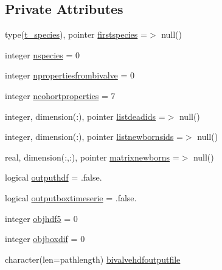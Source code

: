 \subsection*{Private Attributes}
\begin{DoxyCompactItemize}
\item 
type(\mbox{\hyperlink{structmodulewaterproperties_1_1t__species}{t\+\_\+species}}), pointer \mbox{\hyperlink{structmodulewaterproperties_1_1t__bivalve_aff0dedcc1fe7767061a4946a67d32e77}{firstspecies}} =$>$ null()
\item 
integer \mbox{\hyperlink{structmodulewaterproperties_1_1t__bivalve_aa56dd58a478ccddc5077475029f1688a}{nspecies}} = 0
\item 
integer \mbox{\hyperlink{structmodulewaterproperties_1_1t__bivalve_a4d5c1183b40a7fbba495d172d0791b52}{npropertiesfrombivalve}} = 0
\item 
integer \mbox{\hyperlink{structmodulewaterproperties_1_1t__bivalve_ab9d402d4317f13631e6347a8ee3f27f1}{ncohortproperties}} = 7
\item 
integer, dimension(\+:), pointer \mbox{\hyperlink{structmodulewaterproperties_1_1t__bivalve_ad7693ee1677a78aa982f8099471c1566}{listdeadids}} =$>$ null()
\item 
integer, dimension(\+:), pointer \mbox{\hyperlink{structmodulewaterproperties_1_1t__bivalve_a147e4679c4117ccb69a571135489265e}{listnewbornsids}} =$>$ null()
\item 
real, dimension(\+:,\+:), pointer \mbox{\hyperlink{structmodulewaterproperties_1_1t__bivalve_ae4416603c9b357924969a1e093f925e9}{matrixnewborns}} =$>$ null()
\item 
logical \mbox{\hyperlink{structmodulewaterproperties_1_1t__bivalve_a45597b29897557940a55026e15f9efe8}{outputhdf}} = .false.
\item 
logical \mbox{\hyperlink{structmodulewaterproperties_1_1t__bivalve_a814ce03a6920f9fe63a022d0f7cfaabb}{outputboxtimeserie}} = .false.
\item 
integer \mbox{\hyperlink{structmodulewaterproperties_1_1t__bivalve_af2f8601a52ddc367f51678619ade225d}{objhdf5}} = 0
\item 
integer \mbox{\hyperlink{structmodulewaterproperties_1_1t__bivalve_a18e8d422f7c1458b1f000b8b21bf9960}{objboxdif}} = 0
\item 
character(len=pathlength) \mbox{\hyperlink{structmodulewaterproperties_1_1t__bivalve_a5f83a739cd0c3777b70515abeb9cb8e9}{bivalvehdfoutputfile}}
\end{DoxyCompactItemize}


